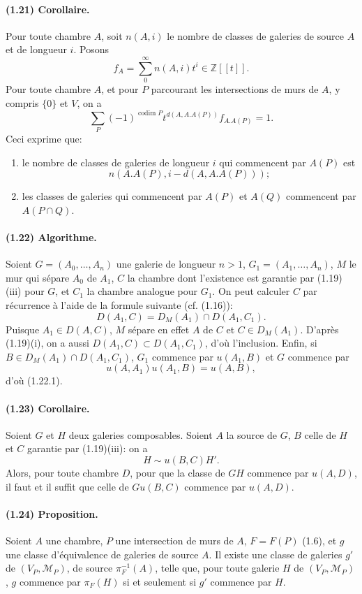 \documentclass[10pt]{article}
\newcommand{\Z}{\mathbb Z}
\newcommand{\codim}{\operatorname{codim}}
\begin{document}
\paragraph{(1.21) Corollaire.} Pour toute chambre $A$, soit $n(A,i)$ le nombre de classes de galeries de source $A$ et de longueur $i$. Posons
\[
f_A=\sum_{0}^{\infty}n(A,i)t^i\in\Z[[t]].
\]
Pour toute chambre $A$, et pour $P$ parcourant les intersections de murs de $A$, y compris $\{0\}$ et $V$, on a
\[
\sum_P (-1)^{\codim P}t^{d(A,A.A(P))}f_{A.A(P)}=1.
\]
Ceci exprime que:
\begin{enumerate}[label=\alph*)]
\item le nombre de classes de galeries de longueur $i$ qui commencent par $A(P)$ est
\[
n(A.A(P),i-d(A,A.A(P)));
\]
\item les classes de galeries qui commencent par $A(P)$ et $A(Q)$ commencent par $A(P\cap Q)$.
\end{enumerate}

\paragraph{(1.22) Algorithme.} Soient $G=(A_0,\ldots,A_n)$ une galerie de longueur $n>1$, $G_1=(A_1,\ldots,A_n)$, $M$ le mur qui sépare $A_0$ de $A_1$, $C$ la chambre dont l'existence est garantie par (1.19)(iii) pour $G$, et $C_1$ la chambre analogue pour $G_1$. On peut calculer $C$ par récurrence à l'aide de la formule suivante (cf. (1.16)):
\[
\tag{1.22.1}
D(A_1,C)=D_M(A_1)\cap D(A_1,C_1).
\]
Puisque $A_1\in D(A,C)$, $M$ sépare en effet $A$ de $C$ et $C\in D_M(A_1)$. D'après (1.19)(i), on a aussi $D(A_1,C)\subset D(A_1,C_1)$, d'où l'inclusion. Enfin, si $B\in D_M(A_1)\cap D(A_1,C_1)$, $G_1$ commence par $u(A_1,B)$ et $G$ commence par
\[
u(A,A_1)u(A_1,B)=u(A,B),
\]
d'où (1.22.1).

\paragraph{(1.23) Corollaire.} Soient $G$ et $H$ deux galeries composables. Soient $A$ la source de $G$, $B$ celle de $H$ et $C$ garantie par (1.19)(iii): on a
\[
H\sim u(B,C)H'.
\]
Alors, pour toute chambre $D$, pour que la classe de $GH$ commence par $u(A,D)$, il faut et il suffit que celle de $Gu(B,C)$ commence par $u(A,D)$.




\paragraph{(1.24) Proposition.} Soient \(A\) une chambre, \(P\) une intersection de murs de \(A\), \(F=F(P)\) (1.6), et \(g\) une classe d'équivalence de galeries de source \(A\). Il existe une classe de galeries \(g'\) de \((V_P,\mathcal M_P)\), de source \(\pi_F^{-1}(A)\), telle que, pour toute galerie \(H\) de \((V_P,\mathcal M_P)\), \(g\) commence par \(\pi_F(H)\) si et seulement si \(g'\) commence par \(H\).
\end{document}
